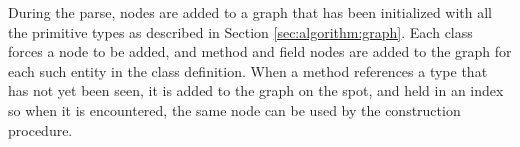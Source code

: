 During the parse, nodes are added to a graph that has been initialized with all the primitive types as described in Section \ref{sec:algorithm:graph}. Each class forces a node to be added, and method and field nodes are added to the graph for each such entity in the class definition. When a method references a type that has not yet been seen, it is added to the graph on the spot, and held in an index so when it is encountered, the same node can be used by the construction procedure.
